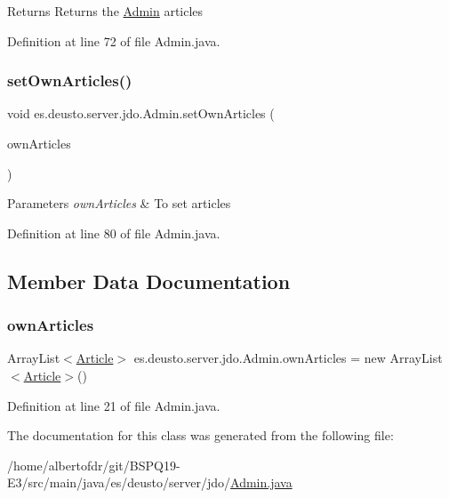 \begin{DoxyReturn}{Returns}
Returns the \hyperlink{classes_1_1deusto_1_1server_1_1jdo_1_1_admin}{Admin} articles 
\end{DoxyReturn}


Definition at line 72 of file Admin.\+java.

\mbox{\label{classes_1_1deusto_1_1server_1_1jdo_1_1_admin_abb330a6e4c9e543fff03ab213055c2c4}} 
\subsubsection{\texorpdfstring{set\+Own\+Articles()}{setOwnArticles()}}
{\footnotesize\ttfamily void es.\+deusto.\+server.\+jdo.\+Admin.\+set\+Own\+Articles (\begin{DoxyParamCaption}\item[{Array\+List$<$ \hyperlink{classes_1_1deusto_1_1server_1_1jdo_1_1_article}{Article} $>$}]{own\+Articles }\end{DoxyParamCaption})}


\begin{DoxyParams}{Parameters}
{\em own\+Articles} & To set articles \\
\hline
\end{DoxyParams}


Definition at line 80 of file Admin.\+java.



\subsection{Member Data Documentation}
\mbox{\label{classes_1_1deusto_1_1server_1_1jdo_1_1_admin_aff35b2a52374104224e98ba92fd7eac3}} 
\subsubsection{\texorpdfstring{own\+Articles}{ownArticles}}
{\footnotesize\ttfamily Array\+List$<$\hyperlink{classes_1_1deusto_1_1server_1_1jdo_1_1_article}{Article}$>$ es.\+deusto.\+server.\+jdo.\+Admin.\+own\+Articles = new Array\+List$<$\hyperlink{classes_1_1deusto_1_1server_1_1jdo_1_1_article}{Article}$>$()}



Definition at line 21 of file Admin.\+java.



The documentation for this class was generated from the following file\+:\begin{DoxyCompactItemize}
\item 
/home/albertofdr/git/\+B\+S\+P\+Q19-\/\+E3/src/main/java/es/deusto/server/jdo/\hyperlink{_admin_8java}{Admin.\+java}\end{DoxyCompactItemize}
